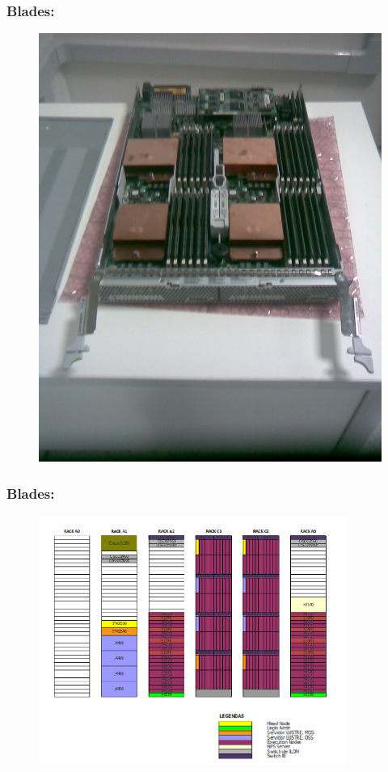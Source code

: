 \documentclass[10pt]{beamer}
\begin{document}
		\begin{frame}%
		\frametitle{Blades:}
			\begin{figure}
			\centering
				\includegraphics[scale=0.15]{./figuras/img_blade.jpg}
			\end{figure}
		\end{frame}

		\begin{frame}%
		\frametitle{Blades:}
			\begin{figure}
			\centering
				\includegraphics[width=0.9\textwidth]{./figuras/mapa_racks.png}
			\end{figure}
		\end{frame}
\end{document}

